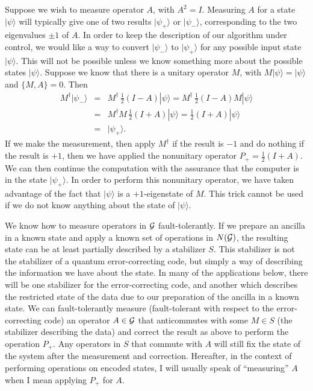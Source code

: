 \documentclass{report}
\newcommand{\G}{{\cal G}}
\newcommand{\ket}[1]{|{#1}\rangle}
\begin{document}
Suppose we wish to measure operator $A$, with $A^2 = I$.  Measuring $A$ 
for a state $\ket{\psi}$ will typically give one of two results $\ket{\psi_+}$ 
or $\ket{\psi_-}$, corresponding to the two eigenvalues $\pm 1$ of $A$.  
In order to keep the description of our algorithm under control, we would 
like a way to convert $\ket{\psi_-}$ to $\ket{\psi_+}$ for any possible 
input state $\ket{\psi}$.  This will not be possible unless we know 
something more about the possible states $\ket{\psi}$.  Suppose we know 
that there is a unitary operator $M$, with $M \ket{\psi} = \ket{\psi}$ and 
$\{M, A\} = 0$.  Then
\begin{eqnarray}
M^\dagger \ket{\psi_-} & = & M^\dagger \, \frac{1}{2} (I - A) \ket{\psi} = 
M^\dagger \, \frac{1}{2} (I - A) M \ket{\psi} \nonumber \\
& = & M^\dagger M \, \frac{1}{2} (I + A) \ket{\psi} = 
\frac{1}{2} (I + A) \ket{\psi} \\
& = & \ket{\psi_+}. \nonumber
\end{eqnarray}
If we make the measurement, then apply $M^\dagger$ if the result is $-1$ 
and do nothing if the result is $+1$, then we have applied the nonunitary 
operator $P_+ = \frac{1}{2} (I + A)$.  We can then continue the computation 
with the assurance that the computer is in the state $\ket{\psi_+}$.  In
order to perform this nonunitary operator, we have taken advantage of the
fact that $\ket{\psi}$ is a $+1$-eigenstate of $M$.  This trick cannot
be used if we do not know anything about the state of $\ket{\psi}$.

We know how to measure operators in $\G$ fault-tolerantly.  If we prepare an 
ancilla in a known state and apply a known set of operations in $N(\G)$, 
the resulting state can be at least partially described by a stabilizer $S$.
This stabilizer is not the stabilizer of a quantum error-correcting code,
but simply a way of describing the information we have about the state.  In
many of the applications below, there will be one stabilizer for the 
error-correcting code, and another which describes the restricted state of 
the data due to our preparation of the ancilla in a known state.  We can 
fault-tolerantly measure (fault-tolerant with respect to the error-correcting 
code) an operator $A \in \G$ that anticommutes with some $M \in S$ (the 
stabilizer describing the data) and correct the result as above to 
perform the operation $P_+$.  Any operators in $S$ that commute with $A$ 
will still fix the state of the system after the measurement and correction.  
Hereafter, in the context of performing operations on encoded states, I will 
usually speak of ``measuring'' $A$ when I mean applying $P_+$ for $A$.
\end{document}
